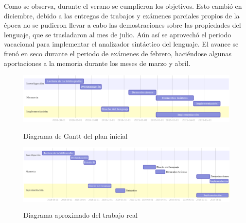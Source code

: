 Como se observa, durante el verano se cumplieron los objetivos. Esto cambió en diciembre, debido a las entregas de trabajos y exámenes parciales propios de la época no se pudieron llevar a cabo las demostraciones sobre las propiedades del lenguaje, que se trasladaron al mes de julio. 
Aún así se aprovechó el periodo vacacional para implementar el analizador sintáctico del lenguaje. El avance se frenó en seco durante el periodo de exámenes de febrero, haciéndose algunas aportaciones a la memoria durante los meses de marzo y abril.\\

\begin{landscape}
	\begin{figure}[h]
		\begin{center}
			\includegraphics[width=1.6\textwidth]{imagenes/gantt1.png}
			\caption{Diagrama de Gantt del plan inicial}
			\label{fig:gantt1}
			\bigskip
			\bigskip
			\bigskip
			\includegraphics[width=1.6\textwidth]{imagenes/gantt2.png}
			\caption{Diagrama aproximado del trabajo real}
			\label{fig:gantt2}
		\end{center}
	\end{figure}
\end{landscape}